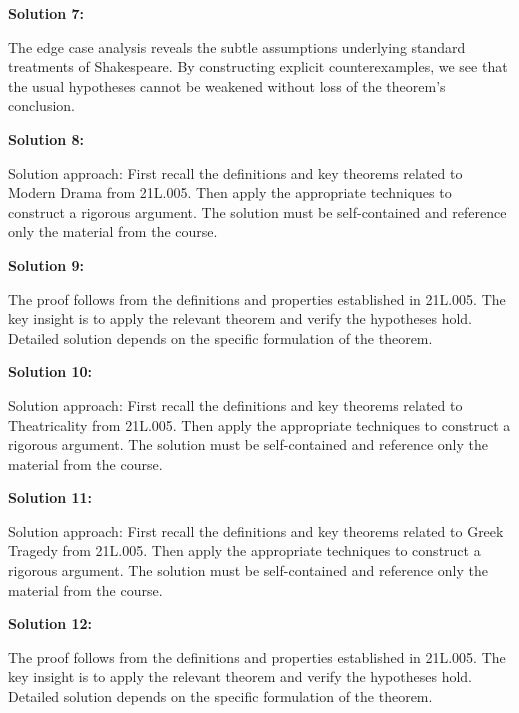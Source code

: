 \documentclass[12pt,a4paper]{exam}
\begin{document}
\vspace{0.5cm}

\textbf{Solution 7:}

The edge case analysis reveals the subtle assumptions underlying standard treatments of Shakespeare. By constructing explicit counterexamples, we see that the usual hypotheses cannot be weakened without loss of the theorem's conclusion.

\vspace{0.5cm}

\textbf{Solution 8:}

Solution approach: First recall the definitions and key theorems related to Modern Drama from 21L.005. Then apply the appropriate techniques to construct a rigorous argument. The solution must be self-contained and reference only the material from the course.

\vspace{0.5cm}

\textbf{Solution 9:}

The proof follows from the definitions and properties established in 21L.005. The key insight is to apply the relevant theorem and verify the hypotheses hold. Detailed solution depends on the specific formulation of the theorem.

\vspace{0.5cm}

\textbf{Solution 10:}

Solution approach: First recall the definitions and key theorems related to Theatricality from 21L.005. Then apply the appropriate techniques to construct a rigorous argument. The solution must be self-contained and reference only the material from the course.

\vspace{0.5cm}

\textbf{Solution 11:}

Solution approach: First recall the definitions and key theorems related to Greek Tragedy from 21L.005. Then apply the appropriate techniques to construct a rigorous argument. The solution must be self-contained and reference only the material from the course.

\vspace{0.5cm}

\textbf{Solution 12:}

The proof follows from the definitions and properties established in 21L.005. The key insight is to apply the relevant theorem and verify the hypotheses hold. Detailed solution depends on the specific formulation of the theorem.
\end{document}
